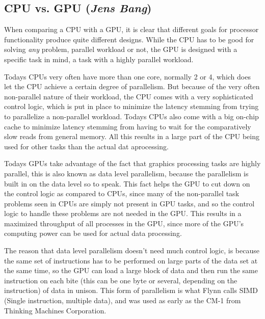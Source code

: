 \subsection{CPU vs. GPU (\textit{Jens Bang})}
When comparing a CPU with a GPU, it is clear that different goals for processor functionality produce quite different designs. While the CPU has to be good for solving \emph{any} problem, parallel workload or not, the GPU is designed with a specific task in mind, a task with a highly parallel workload.


Todays CPUs very often have more than one core, normally 2 or 4, which does let the CPU achieve a certain degree of parallelism. But because of the very often non-parallel nature of their workload, the CPU comes with a very sophisticated control logic, which is put in place to minimize the latency stemming from trying to parallelize a non-parallel workload. Todays CPUs also come with a big on-chip cache to minimize latency stemming from having to wait for the comparatively slow reads from general memory. All this results in a large part of the CPU being used for other tasks than the actual dat aprocessing.

Todays GPUs take advantage of the fact that graphics processing tasks are highly parallel, this is also known as data level parallelism, because the parallelism is built in on the data level so to speak. This fact helps the GPU to cut down on the control logic as compared to CPUs, since many of the non-parallel task problems seen in CPUs are simply not present in GPU tasks, and so the control logic to handle these problems are not needed in the GPU. This results in a maximized throughput of all processes in the GPU, since more of the GPU's computing power can be used for actual data processing.

The reason that data level parallelism doesn't need much control logic, is because the same set of instructions has to be performed on large parts of the data set at the same time, so the GPU can load a large block of data and then run the same instruction on each bite (this can be one byte or several, depending on the instruction) of data in unison. This form of parallelism is what Flynn calls SIMD (Single instruction, multiple data), and was used as early as the CM-1 from Thinking Machines Corporation.

